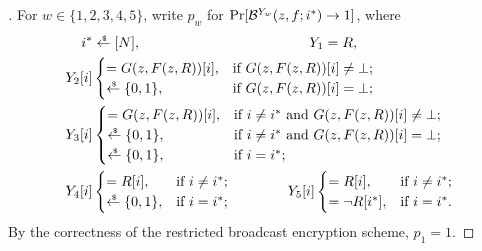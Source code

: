 \begin{proof}[]
For ${w\in\{1,2,3,4,5\}}$,
write $p_w$ for ${\Pr[{\mathcal{B}}^{Y_w}(z,f;i^\ast)\to 1]}$, where
\begin{align*}
i^\ast&{}\draws[N],
\qquad\qquad\qquad\qquad\qquad\qquad
Y_1=R,\\
Y_2[i]&\begin{cases}
=G(z,F(z,R))[i],&\textup{if }G(z,F(z,R))[i]\neq\bot;\\
\draws\bit,&\textup{if }G(z,F(z,R))[i]=\bot;
\end{cases}\\
Y_3[i]&\begin{cases}
=G(z,F(z,R))[i],&\textup{if }i\neq i^\ast\textup{ and }G(z,F(z,R))[i]\neq\bot;\\
\draws\bit,&\textup{if }i\neq i^\ast\textup{ and }G(z,F(z,R))[i]=\bot;\\
\draws\bit,&\textup{if }i=i^\ast;
\end{cases}\\
Y_4[i]&\begin{cases}
=R[i],&\textup{if }i\neq i^\ast;\\
\draws\bit,&\textup{if }i=i^\ast;
\end{cases}
\qquad\qquad
Y_5[i]\begin{cases}
=R[i],&\textup{if }i\neq i^\ast;\\
=\neg R[i^\ast],&\textup{if }i=i^\ast.
\end{cases}
\end{align*}
By the correctness of the restricted broadcast encryption scheme,
${p_1=1}$.


\end{proof}
